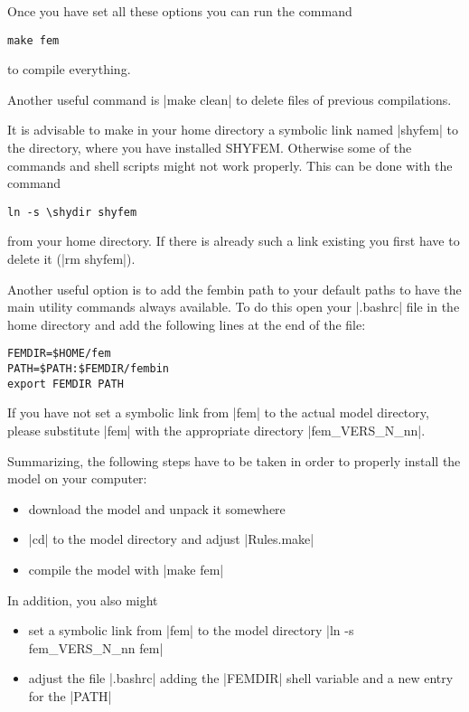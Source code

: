 Once you have set all these options you can run the command

\begin{citation}
\verb|make fem|
\end{citation}

to compile everything.

Another useful command is |make clean| to delete files of previous compilations.

It is advisable to make in your home directory a symbolic link named
|shyfem| to the directory, where you have installed SHYFEM. Otherwise
some of the commands and shell scripts might not work properly. This
can be done with the command

\begin{citation}
\verb|ln -s \shydir shyfem|
\end{citation}

from your home directory. If there is already such a link existing you first
have to delete it (|rm shyfem|).

Another useful option is to add the fembin path to your default paths
to have the main utility commands always available. To do this
open your |.bashrc| file in the home directory
and add the following lines at the end of the file:

\begin{verbatim}
FEMDIR=$HOME/fem
PATH=$PATH:$FEMDIR/fembin
export FEMDIR PATH
\end{verbatim}

If you have not set a symbolic link from |fem| to the actual model directory,
please substitute |fem| with the appropriate directory |fem_VERS_N_nn|.

Summarizing, the following steps have to be taken in order to
properly install the model on your computer:
\begin{itemize}
\item download the model and unpack it somewhere
\item |cd| to the model directory and adjust |Rules.make|
\item compile the model with |make fem|
\end{itemize}

In addition, you also might
\begin{itemize}
\item set a symbolic link from |fem| to the model directory
		|ln -s fem_VERS_N_nn fem|
\item adjust the file |.bashrc| adding the |FEMDIR| shell variable 
	and a new entry for the |PATH|
\end{itemize}
